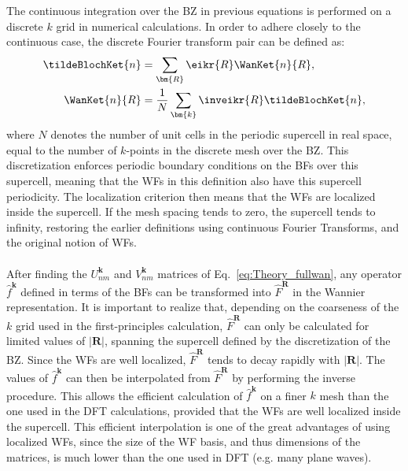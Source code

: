 The continuous integration over the BZ in previous equations is performed on a discrete $k$ grid in numerical calculations.
In order to adhere closely to the continuous case, the discrete Fourier transform pair can be defined as:
\begin{align}
	\tildeBlochKet{n} &= \sum_{\bm{R}} \eikr{R} \WanKet{n}{R},\label{eq:Theory_wantok}\\
	\WanKet{n}{R} &= \frac{1}{N}\sum_{\bm{k}} \inveikr{R} \tildeBlochKet{n},
\end{align}
where $N$ denotes the number of unit cells in the periodic supercell in real space, equal to the number of $k$-points in the discrete mesh over the BZ.
This discretization enforces periodic boundary conditions on the BFs over this supercell, meaning that the WFs in this definition also have this supercell periodicity.
The localization criterion then means that the WFs are localized inside the supercell.
If the mesh spacing tends to zero, the supercell tends to infinity, restoring the earlier definitions using continuous Fourier Transforms, and the original notion of WFs.
\\\\
After finding the $U^{\bm{k}}_{nm}$ and $V^{\bm{k}}_{nm}$ matrices of Eq.~\eqref{eq:Theory_fullwan}, any operator $\hat{f}^{\bm{k}}$ defined in terms of the BFs can be transformed into $\hat{F}^{\bm{R}}$ in the Wannier representation.
It is important to realize that, depending on the coarseness of the $k$ grid used in the first-principles calculation, $\hat{F}^{\bm{R}}$ can only be calculated for limited values of $|\bm{R}|$, spanning the supercell defined by the discretization of the BZ.
Since the WFs are well localized, $\hat{F}^{\bm{R}}$ tends to decay rapidly with $|\bm{R}|$.
The values of $\hat{f}^{\bm{k}}$ can then be interpolated from $\hat{F}^{\bm{R}}$ by performing the inverse procedure.
This allows the efficient calculation of $\hat{f}^{\bm{k}}$ on a finer $k$ mesh than the one used in the DFT calculations, provided that the WFs are well localized inside the supercell.
This efficient interpolation is one of the great advantages of using localized WFs, since the size of the WF basis, and thus dimensions of the matrices, is much lower than the one used in DFT (e.g. many plane waves).

